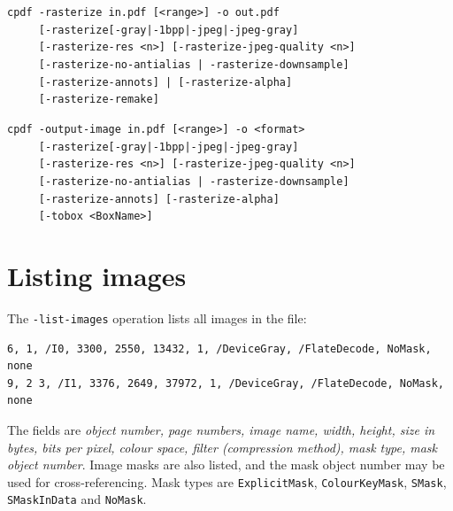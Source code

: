 \documentclass{book}
\begin{document}
\begin{framed}
\vspace{1.5mm}

\noindent\small\verb!cpdf -rasterize in.pdf [<range>] -o out.pdf!\\
\noindent\small\verb!     [-rasterize[-gray|-1bpp|-jpeg|-jpeg-gray]!\\
\noindent\small\verb!     [-rasterize-res <n>] [-rasterize-jpeg-quality <n>]!\\
\noindent\small\verb!     [-rasterize-no-antialias | -rasterize-downsample]!\\
\noindent\small\verb!     [-rasterize-annots] | [-rasterize-alpha]!\\
\noindent\small\verb!     [-rasterize-remake]!

\vspace{1.5mm}

\noindent\small\verb!cpdf -output-image in.pdf [<range>] -o <format>!\\
\noindent\small\verb!     [-rasterize[-gray|-1bpp|-jpeg|-jpeg-gray]!\\
\noindent\small\verb!     [-rasterize-res <n>] [-rasterize-jpeg-quality <n>]!\\
\noindent\small\verb!     [-rasterize-no-antialias | -rasterize-downsample]!\\
\noindent\small\verb!     [-rasterize-annots] [-rasterize-alpha]!\\
\noindent\small\verb!     [-tobox <BoxName>]!

\end{framed}



\section{Listing images}

The \texttt{-list-images} operation lists all images in the file:

  \begin{framed}
{\small\begin{verbatim}
6, 1, /I0, 3300, 2550, 13432, 1, /DeviceGray, /FlateDecode, NoMask, none
9, 2 3, /I1, 3376, 2649, 37972, 1, /DeviceGray, /FlateDecode, NoMask, none\end{verbatim}}
  \end{framed}

\noindent The fields are \textit{object number, page numbers, image name, width, height, size in bytes, bits per pixel, colour space, filter (compression method), mask type, mask object number}. Image masks are also listed, and the mask object number may be used for cross-referencing. Mask types are \texttt{ExplicitMask}, \texttt{ColourKeyMask}, \texttt{SMask}, \texttt{SMaskInData} and \texttt{NoMask}.
\end{document}
